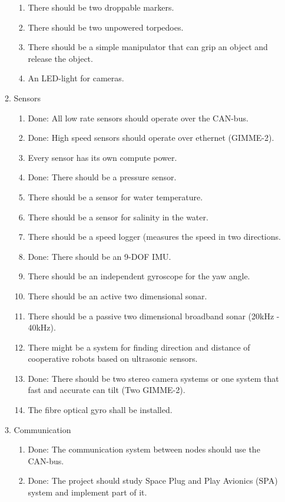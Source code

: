 \begin{enumerate}
\begin{enumerate}
\begin{enumerate}
\item There should be two droppable markers.
\item There should be two unpowered torpedoes.
\item There should be a simple manipulator that can grip an object and release the object.
\item An LED-light for cameras.
\end{enumerate}
\item Sensors
\begin{enumerate}
\item {\color{green}Done: All low rate sensors should operate over the CAN-bus.}
\item {\color{green}Done: High speed sensors should operate over ethernet (GIMME-2).}
\item {\color{red} Every sensor has its own compute power.}
\item {\color{green}Done: There should be a pressure sensor.}
\item There should be a sensor for water temperature.
\item {\color{red} There should be a sensor for salinity in the water.}
\item There should be a speed logger (measures the speed in two directions.
\item {\color{green}Done: There should be an 9-DOF IMU.}
\item There should be an independent gyroscope for the yaw angle.
\item There should be an active two dimensional sonar.
\item There should be a passive two dimensional broadband sonar (20kHz  - 40kHz).
\item {\color{red} There might be a system for finding direction and distance of cooperative robots based on ultrasonic sensors.}
\item {\color{green}Done: There should be two stereo camera systems or one system that fast and accurate can tilt (Two GIMME-2).}
\item The fibre optical gyro shall be installed.
\end{enumerate}
\item Communication
\begin{enumerate}
\item {\color{green}Done: The communication system between nodes should use the CAN-bus.}
\item {\color{green}Done: The project should study Space Plug and Play Avionics (SPA) system and implement part of it.}

\end{enumerate}
\end{enumerate}
\end{enumerate}
